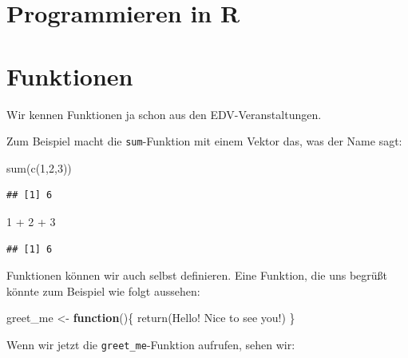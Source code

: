 \documentclass[
]{book}
\newenvironment{Shaded}{\begin{snugshade}}{\end{snugshade}}
\newcommand{\ControlFlowTok}[1]{\textcolor[rgb]{0.13,0.29,0.53}{\textbf{#1}}}
\newcommand{\DecValTok}[1]{\textcolor[rgb]{0.00,0.00,0.81}{#1}}
\newcommand{\FunctionTok}[1]{\textcolor[rgb]{0.00,0.00,0.00}{#1}}
\newcommand{\NormalTok}[1]{#1}
\newcommand{\OtherTok}[1]{\textcolor[rgb]{0.56,0.35,0.01}{#1}}
\newcommand{\SpecialCharTok}[1]{\textcolor[rgb]{0.00,0.00,0.00}{#1}}
\newcommand{\StringTok}[1]{\textcolor[rgb]{0.31,0.60,0.02}{#1}}
\begin{document}
\hypertarget{programmieren-in-r}{%
\chapter{Programmieren in R}\label{programmieren-in-r}}

\hypertarget{funktionen}{%
\chapter{Funktionen}\label{funktionen}}

Wir kennen Funktionen ja schon aus den EDV-Veranstaltungen.

Zum Beispiel macht die \texttt{sum}-Funktion mit einem Vektor das, was der Name sagt:

\begin{Shaded}
\begin{Highlighting}[]
\FunctionTok{sum}\NormalTok{(}\FunctionTok{c}\NormalTok{(}\DecValTok{1}\NormalTok{,}\DecValTok{2}\NormalTok{,}\DecValTok{3}\NormalTok{))}
\end{Highlighting}
\end{Shaded}

\begin{verbatim}
## [1] 6
\end{verbatim}

\begin{Shaded}
\begin{Highlighting}[]
\DecValTok{1} \SpecialCharTok{+} \DecValTok{2} \SpecialCharTok{+} \DecValTok{3}
\end{Highlighting}
\end{Shaded}

\begin{verbatim}
## [1] 6
\end{verbatim}

Funktionen können wir auch selbst definieren. Eine Funktion, die uns begrüßt könnte zum Beispiel wie folgt aussehen:

\begin{Shaded}
\begin{Highlighting}[]
\NormalTok{greet\_me }\OtherTok{\textless{}{-}} \ControlFlowTok{function}\NormalTok{()\{}
  \FunctionTok{return}\NormalTok{(}\StringTok{\textquotesingle{}Hello! Nice to see you!\textquotesingle{}}\NormalTok{)}
\NormalTok{\}}
\end{Highlighting}
\end{Shaded}

Wenn wir jetzt die \texttt{greet\_me}-Funktion aufrufen, sehen wir:
\end{document}
